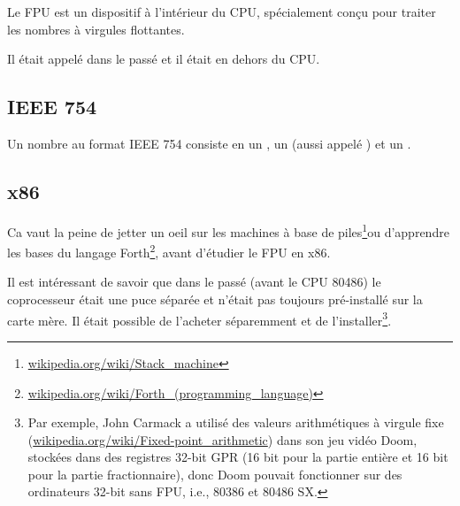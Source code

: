 \section{\FPUChapterName}
\label{sec:FPU}

\newcommand{\FNURLSTACK}{\footnote{\href{http://go.yurichev.com/17123}{wikipedia.org/wiki/Stack\_machine}}}
\newcommand{\FNURLFORTH}{\footnote{\href{http://go.yurichev.com/17124}{wikipedia.org/wiki/Forth\_(programming\_language)}}}
\newcommand{\FNURLIEEE}{\footnote{\href{http://go.yurichev.com/17125}{wikipedia.org/wiki/IEEE\_floating\_point}}}
\newcommand{\FNURLSP}{\footnote{\href{http://go.yurichev.com/17126}{wikipedia.org/wiki/Single-precision\_floating-point\_format}}}
\newcommand{\FNURLDP}{\footnote{\href{http://go.yurichev.com/17127}{wikipedia.org/wiki/Double-precision\_floating-point\_format}}}
\newcommand{\FNURLEP}{\footnote{\href{http://go.yurichev.com/17128}{wikipedia.org/wiki/Extended\_precision}}}

Le \ac{FPU} est un dispositif à l'intérieur du \ac{CPU}, spécialement conçu pour
traiter les nombres à virgules flottantes.

Il était appelé  dans le passé et il était en dehors du \ac{CPU}.

\subsection{IEEE 754}

Un nombre au format IEEE 754 consiste en un , un  (aussi
appelé ) et un .

\subsection{x86}

Ca vaut la peine de jetter un oeil sur les machines à base de piles\FNURLSTACK ou
d'apprendre les bases du langage Forth\FNURLFORTH, avant d'étudier le \ac{FPU} en
x86.

Il est intéressant de savoir que dans le passé (avant le CPU 80486) le coprocesseur
était une puce séparée et n'était pas toujours pré-installé sur la carte mère. Il
était possible de l'acheter séparemment et de l'installer\footnote{Par exemple, John
Carmack a utilisé des valeurs arithmétiques à virgule fixe
(\href{http://go.yurichev.com/17356}{wikipedia.org/wiki/Fixed-point\_arithmetic})
dans son jeu vidéo Doom, stockées dans des registres 32-bit \ac{GPR} (16 bit pour
la partie entière et 16 bit pour la partie fractionnaire), donc Doom pouvait fonctionner
sur des ordinateurs 32-bit sans FPU, i.e., 80386 et 80486 SX.}.

